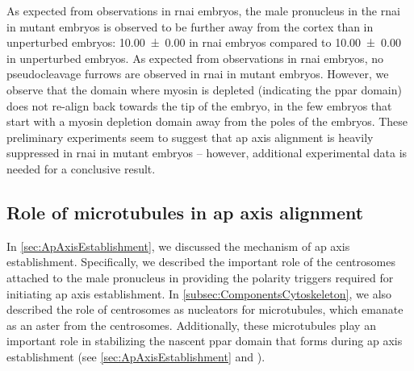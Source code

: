 As expected from observations in  \ac{rnai} embryos, the male pronucleus in the  \ac{rnai} in  mutant embryos is observed to be further away from the cortex than in unperturbed embryos: \SI{10.00 +- 0.00}{\unitLength} in \ac{rnai} embryos compared to \SI{10.00 +- 0.00}{\unitLength} in unperturbed embryos. As expected from observations in  \ac{rnai} embryos, no pseudocleavage furrows are observed in  \ac{rnai} in  mutant embryos. However, we observe that the domain where myosin is depleted (indicating the \ac{ppar} domain) does not re-align back towards the tip of the embryo, in the few embryos that start with a myosin depletion domain away from the poles of the embryos. These preliminary experiments seem to suggest that \ac{ap} axis alignment is heavily suppressed in  \ac{rnai} in  mutant embryos -- however, additional experimental data is needed for a conclusive result.


\subsection{Role of microtubules in \acs{ap} axis alignment}\label{subsec:MicrotubuleRoleGoa1Gpa16}
In \autoref{sec:ApAxisEstablishment}, we discussed the mechanism of \ac{ap} axis establishment. Specifically, we described the important role of the centrosomes attached to the male pronucleus in providing the polarity triggers required for initiating \ac{ap} axis establishment. In \autoref{subsec:ComponentsCytoskeleton}, we also described the role of centrosomes as nucleators for microtubules, which emanate as an aster from the centrosomes. Additionally, these microtubules play an important role in stabilizing the nascent \ac{ppar} domain that forms during \ac{ap} axis establishment (see \autoref{sec:ApAxisEstablishment} and \cite{wallenfang2000polarization}). 

